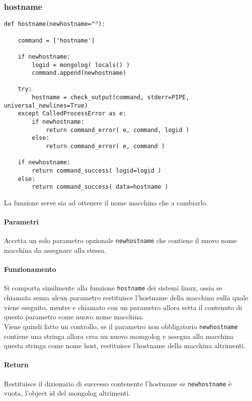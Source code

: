 \documentclass[11pt]{article}
\begin{document}
\subsubsection{hostname}\label{hostname}
\begin{lstlisting}
def hostname(newhostname=""):
    
    command = ['hostname']
        
    if newhostname:
        logid = mongolog( locals() )
        command.append(newhostname)

    try:
        hostname = check_output(command, stderr=PIPE, universal_newlines=True)
    except CalledProcessError as e:
        if newhostname:
            return command_error( e, command, logid )
        else:
            return command_error( e, command )

    if newhostname:
        return command_success( logid=logid )
    else:
        return command_success( data=hostname )
\end{lstlisting}
La funzione serve sia ad ottenere il nome macchina che a cambiarlo.
\paragraph{Parametri}
Accetta un solo parametro opzionale \texttt{newhostname} che contiene il nuovo nome macchina da assegnare alla stessa.
\paragraph{Funzionamento}
Si comporta similmente alla funzione \texttt{hostname} dei sistemi linux, ossia se chiamata senza alcun parametro
restituisce l'hostname della macchina sulla quale viene eseguito, mentre e chiamato con un parametro allora setta
il contenuto di questo parametro come nuovo nome macchina.\\
Viene quindi fatto un controllo, se il parametro non obbligatorio \texttt{newhostname} contiene una stringa
allora crea un nuovo momgolog e assegna alla macchina questa stringa come nome host, restituisce l'hostname
della macchina altrimenti.
\paragraph{Return}
Restituisce il dizionario di successo contenente l'hostname se \texttt{newhostname} è vuota, l'object id
del mongolog altrimenti.
\end{document}
